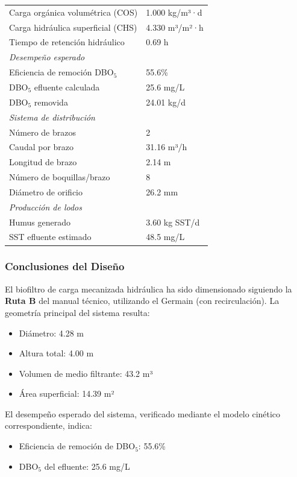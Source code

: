 \documentclass[12pt,a4paper]{article}
\begin{document}
\begin{longtable}{ll}
Carga orgánica volumétrica (COS) & 1.000 kg/m³·d \\
Carga hidráulica superficial (CHS) & 4.330 m³/m²·h \\
Tiempo de retención hidráulico & 0.69 h \\
\midrule
\multicolumn{2}{l}{\textit{Desempeño esperado}} \\
Eficiencia de remoción DBO$_5$ & 55.6\% \\
DBO$_5$ efluente calculada & 25.6 mg/L \\
DBO$_5$ removida & 24.01 kg/d \\
\midrule
\multicolumn{2}{l}{\textit{Sistema de distribución}} \\
Número de brazos & 2 \\
Caudal por brazo & 31.16 m³/h \\
Longitud de brazo & 2.14 m \\
Número de boquillas/brazo & 8 \\
Diámetro de orificio & 26.2 mm \\
\midrule
\multicolumn{2}{l}{\textit{Producción de lodos}} \\
Humus generado & 3.60 kg SST/d \\
SST efluente estimado & 48.5 mg/L \\
\end{longtable}
\endgroup

\subsubsection*{Conclusiones del Diseño}

El biofiltro de carga mecanizada hidráulica ha sido dimensionado siguiendo la \textbf{Ruta B} del manual técnico, utilizando el Germain (con recirculación). La geometría principal del sistema resulta:

\begin{itemize}[noitemsep,leftmargin=2em]
    \item Diámetro: 4.28 m
    \item Altura total: 4.00 m
    \item Volumen de medio filtrante: 43.2 m³
    \item Área superficial: 14.39 m²
\end{itemize}

El desempeño esperado del sistema, verificado mediante el modelo cinético correspondiente, indica:

\begin{itemize}[noitemsep,leftmargin=2em]
    \item Eficiencia de remoción de DBO$_5$: 55.6\%
    \item DBO$_5$ del efluente: 25.6 mg/L

\end{itemize}
\end{document}
